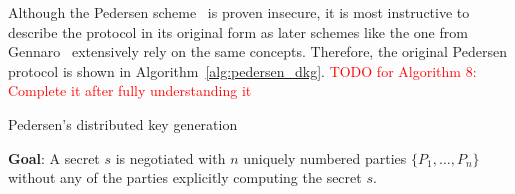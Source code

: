 Although the Pedersen scheme~\cite{art:Pedersen91a} is proven insecure, it is most instructive to describe the protocol in its original form as later schemes like the one from Gennaro~\cite{art:GennaroJKR07} extensively rely on the same concepts. Therefore, the original Pedersen protocol is shown in Algorithm~\ref{alg:pedersen_dkg}. \textcolor{red}{TODO for Algorithm 8: Complete it after fully understanding it}


\begin{algorithm}
\caption{Pedersen's distributed key generation~\cite{art:Pedersen91a}}
\label{alg:pedersen_dkg}
\begin{description}
 \item \textbf{Goal}: A secret $s$ is negotiated with $n$ uniquely numbered parties $\{ P_1, \ldots, P_n \}$ without any of the parties explicitly computing the secret $s$.
 

\end{description}
\end{algorithm}
